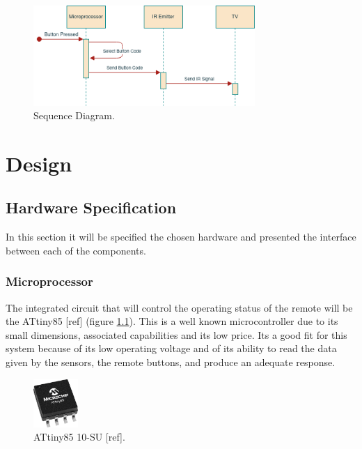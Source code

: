 \documentclass[12pt, letterpaper]{report}
\begin{document}
\begin{figure}[ht]
	\centering
	\includegraphics[width=0.75\textwidth]{SequeceDiagram}
	\caption{Sequence Diagram.}
	\label{fig:seq_diagram}
\end{figure}

\chapter{Design}
\section{Hardware Specification}
In this section it will be specified the chosen hardware and presented the interface between each of the components.

\subsection{Microprocessor}
The integrated circuit that will control the operating status of the remote will be the ATtiny85 [ref] (figure \ref{fig:attiny}). This is a well known microcontroller due to its small dimensions, associated capabilities and its low price. Its a good fit for this system because of its low operating voltage and of its ability to read the data given by the sensors, the remote buttons, and produce an adequate response.

\begin{figure}[ht]
	\centering
	\includegraphics[width=0.15\textwidth]{attiny}
	\caption{ATtiny85 10-SU [ref].}
	\label{fig:attiny}
\end{figure}
\end{document}
